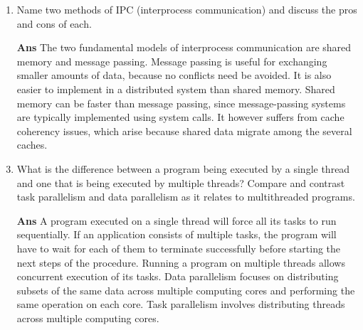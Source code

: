 \documentclass[paper=usletter, fontsize=12pt]{extarticle}
\begin{document}
\begin{enumerate}[label=\textbf{\arabic*}]
        \item Name two methods of IPC (interprocess communication) and discuss
        the pros and cons of each.
        \item[\textbf{Ans}]
        The two fundamental models of interprocess communication are shared
        memory and message passing. Message passing is useful for exchanging
        smaller amounts of data, because no conflicts need be avoided. It is
        also easier to implement in a distributed system than shared memory.
        Shared memory can be faster than message passing, since message-passing
        systems are typically implemented using system calls. It however
        suffers from cache coherency issues, which arise because shared data
        migrate among the several caches.
        \vspace{0.2in}

        \item What is the difference between a program being executed by a
        single thread and one that is being executed by multiple threads?
        Compare and contrast task parallelism and data parallelism as it
        relates to multithreaded programs.
        \item[\textbf{Ans}]
        A program executed on a single thread will force all its tasks to run
        sequentially. If an application consists of multiple tasks, the program
        will have to wait for each of them to terminate successfully before
        starting the next steps of the procedure. Running a program on multiple
        threads allows concurrent execution of its tasks. Data parallelism
        focuses on distributing subsets of the same data across multiple
        computing cores and performing the same operation on each core. Task
        parallelism involves distributing threads across multiple computing
        cores.
        \vspace{0.2in}

    \end{enumerate}
\end{document}

